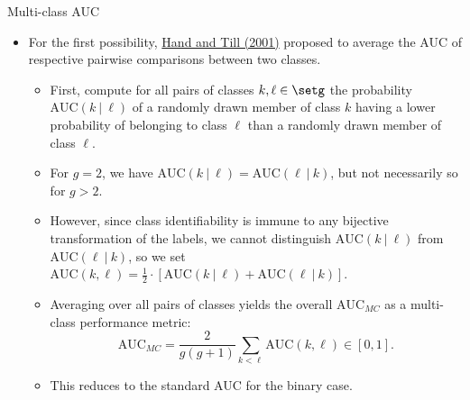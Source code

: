 \documentclass[11pt,compress,t,notes=noshow, xcolor=table]{beamer}
\begin{document}
\begin{vbframe}{Multi-class AUC}
\begin{itemize}  
  \small
  \item For the first possibility, 
  \href{https://link.springer.com/article/10.1023/A:1010920819831}
  {Hand and Till (2001)} proposed to average the AUC of respective pairwise 
  comparisons between two classes.
  \begin{itemize}
    \small
    \item First, compute for all pairs of classes $k, \ell \in \setg$ the 
    probability $\text{AUC}(k ~|~ \ell)$ of a randomly drawn member of class $k$ 
    having a lower probability of belonging to class $\ell$ than a randomly drawn 
    member of class $\ell$.
    \item For $g = 2$, we have $\text{AUC}(k ~|~ \ell) = 
    \text{AUC}(\ell ~|~ k)$, but not necessarily so for $g > 2$.
    \item However, since class identifiability is immune to any bijective 
    transformation of the labels, we cannot distinguish $\text{AUC}(k ~|~ \ell)$ 
    from $\text{AUC}(\ell ~|~ k)$, so we set 
    $\text{AUC}(k, \ell) = \frac{1}{2} \cdot [\text{AUC}(k ~|~ \ell) + 
    \text{AUC}(\ell ~|~ k)]$.
  
  
    \item Averaging over all pairs of classes yields the overall 
    $\text{AUC}_{MC}$ as a multi-class performance metric:
    $$\text{AUC}_{MC} = \frac{2}{g(g + 1)} \sum_{k < \ell} \text{AUC}(k, \ell) 
    \in [0, 1].$$
    \item This reduces to the standard AUC for the binary case.
  \end{itemize}
\end{itemize}
\end{vbframe}


\endlecture
\end{document}
